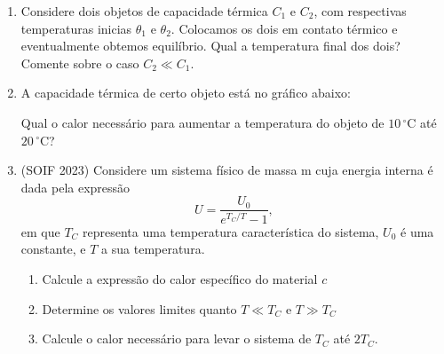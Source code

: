 \begin{enumerate}
    \item 
        Considere dois objetos de capacidade térmica $C_1$ e $C_2$, com
        respectivas temperaturas inicias $\theta_1$ e $\theta_2$. Colocamos os
        dois em contato térmico e eventualmente obtemos equilíbrio. Qual a
        temperatura final dos dois? Comente sobre o caso $C_2\ll C_1$.

    \item
        A capacidade térmica de certo objeto está no gráfico abaixo:
        \begin{figure}[H]
            \centering
        \end{figure}


        Qual o calor necessário para aumentar a temperatura do objeto de $10
        \,\mathrm{^\circ C}$ até $20\,\mathrm{^\circ C}$?

    \item
        (SOIF 2023) Considere um sistema físico de massa m cuja energia interna
        é dada pela expressão
        $$U=\frac{U_0}{e^{T_C/T}-1},$$
        em que $T_C$ representa uma temperatura característica do sistema, $U_0$
        é uma constante, e  $T$ a sua temperatura.
        \begin{enumerate}
            \item 
                Calcule a expressão do calor específico do material $c$ 
            \item 
                Determine os valores limites quanto $T\ll T_C$ e $T\gg T_C$
            \item 
                Calcule o calor necessário para levar o sistema de $T_C$ até
                $2T_C$.
        \end{enumerate}


\end{enumerate}
